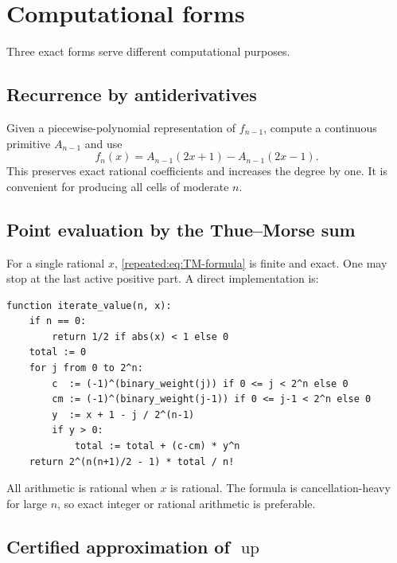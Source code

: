 \documentclass[11pt,oneside]{article}
\theoremstyle{definition}
\theoremstyle{remark}
\newcommand{\Up}{\operatorname{up}}
\begin{document}
\section{Computational forms}
\label{repeated:sec:computation}

Three exact forms serve different computational purposes.

\subsection{Recurrence by antiderivatives}

Given a piecewise-polynomial representation of $f_{n-1}$, compute a continuous primitive
$A_{n-1}$ and use
\begin{equation}
 f_n(x)=A_{n-1}(2x+1)-A_{n-1}(2x-1).                       \label{repeated:eq:primitive-algorithm}
\end{equation}
This preserves exact rational coefficients and increases the degree by one.  It is convenient
for producing all cells of moderate $n$.

\subsection{Point evaluation by the Thue--Morse sum}

For a single rational $x$, \eqref{repeated:eq:TM-formula} is finite and exact.  One may stop at the last
active positive part.  A direct implementation is:

\begin{lstlisting}[style=pseudo,caption={Exact evaluation of the $n$th repeated-integration stage}]
function iterate_value(n, x):
    if n == 0:
        return 1/2 if abs(x) < 1 else 0
    total := 0
    for j from 0 to 2^n:
        c  := (-1)^(binary_weight(j)) if 0 <= j < 2^n else 0
        cm := (-1)^(binary_weight(j-1)) if 0 <= j-1 < 2^n else 0
        y  := x + 1 - j / 2^(n-1)
        if y > 0:
            total := total + (c-cm) * y^n
    return 2^(n(n+1)/2 - 1) * total / n!
\end{lstlisting}

All arithmetic is rational when $x$ is rational.  The formula is cancellation-heavy for large
$n$, so exact integer or rational arithmetic is preferable.

\subsection{Certified approximation of \texorpdfstring{$\Up$}{up}}
\end{document}
